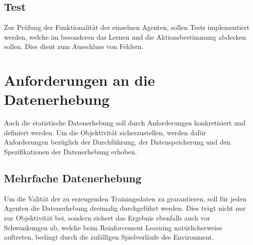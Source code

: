 \subsection{Test}
Zur Prüfung der Funktionalität der einzelnen Agenten, sollen Tests implementiert werden, welche im besonderen das Lernen und die Aktionsbestimmung abdecken sollen. Dies dient zum Ausschluss von Fehlern.

\section{Anforderungen an die Datenerhebung}
Auch die statistische Datenerhebung soll durch Anforderungen konkretisiert und definiert werden. Um die Objektivität sicherzustellen, werden dafür Anforderungen bezüglich der Durchführung, der Datenspeicherung und den Spezifikationen der Datenerhebung erhoben.

\subsection{Mehrfache Datenerhebung}
Um die Valität der zu erzeugenden Trainingsdaten zu grarantieren, soll für jeden Agenten die Datenerhebung dreimalig durchgeführt werden. Dies trägt nicht nur zur Objektivität bei, sondern sichert das Ergebnis ebenfalls auch vor Schwankungen ab, welche beim Reinforcement Learning natürlicherweise auftreten, bedingt durch die zufälligen Spielverläufe des Environment.

